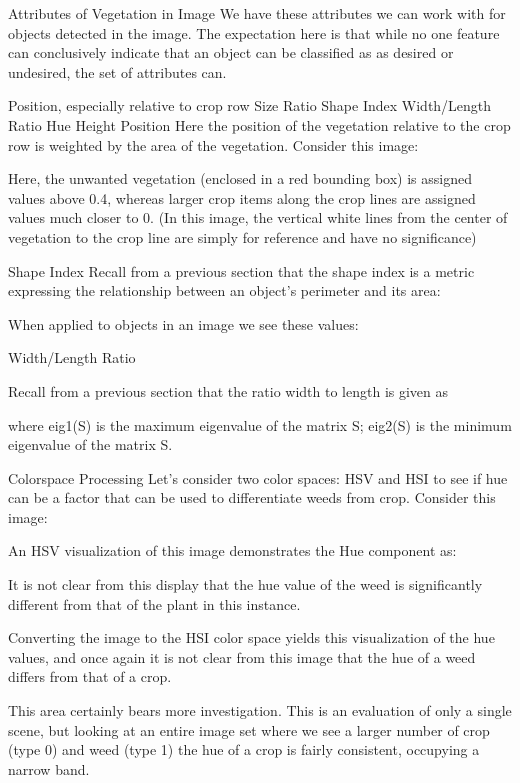 \documentclass[letterpaper]{article}
\begin{document}
Attributes of Vegetation in Image
We have these attributes we can work with for objects detected in the image. The expectation here is that while no one feature can conclusively indicate that an object can be classified as as desired or undesired, the set of attributes can.

Position, especially relative to crop row
Size Ratio
Shape Index
Width/Length Ratio
Hue
Height
Position
Here the position of the vegetation relative to the crop row is weighted by the area of the vegetation. Consider this image:



Here, the unwanted vegetation (enclosed in a red bounding box) is assigned values above 0.4, whereas larger crop items along the crop lines are assigned values much closer to 0. (In this image, the vertical white lines from the center of vegetation to the crop line are simply for reference and have no significance)

Shape Index
Recall from a previous section that the shape index is a metric expressing the relationship between an object’s perimeter and its area:

When applied to objects in an image we see these values:



Width/Length Ratio

Recall from a previous section that the ratio width to length is given as




where eig1(S) is the maximum eigenvalue of the matrix S; eig2(S) is the minimum eigenvalue of the matrix S.

Colorspace Processing
Let’s consider two color spaces: HSV and HSI to see if hue can be a factor that can be used to differentiate weeds from crop. Consider this image:




An HSV visualization of this image demonstrates the Hue component as:

It is not clear from this display that the hue value of the weed is significantly different from that of the plant in this instance.

Converting the image to the HSI color space yields this visualization of the hue values, and once again it is not clear from this image that the hue of a weed differs from that of a crop.

This area certainly bears more investigation. This is an evaluation of only a single scene, but looking at an entire image set where we see a larger number of crop (type 0) and weed (type 1) the hue of a crop is fairly consistent, occupying a narrow band. 
\end{document}
